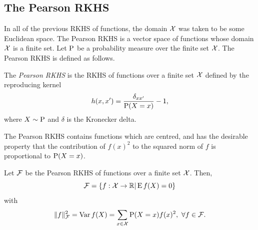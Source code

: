 \subsection{The Pearson RKHS}

In all of the previous RKHS of functions, the domain ${\mathcal X}$ was taken to be some Euclidean space. 
The Pearson RKHS is a vector space of functions whose domain ${\mathcal X}$ is a finite set.
Let $\operatorname{P}$ be a probability measure over the finite set ${\mathcal X}$. 
The Pearson RKHS is defined as follows.

\begin{definition}
  The \emph{Pearson RKHS} is the RKHS of functions over a finite set ${\mathcal X}$ defined by the reproducing kernel
  \[
    h(x,x') = \frac{\delta_{xx'}}{\operatorname{P}(X=x)} - 1,
  \]
  where $X \sim \operatorname{P}$ and $\delta$ is the Kronecker delta.
\end{definition}

The Pearson RKHS contains functions which are centred, and has the desirable property that the contribution of $f(x)^2$ to the squared norm of $f$ is proportional to $\operatorname{P}(X=x)$.

\begin{claim}
  Let ${\mathcal F}$ be the Pearson RKHS of functions over a finite set ${\mathcal X}$.
  Then,
  \[
    {\mathcal F} = \{f:{\mathcal X}\to\mathbb{R} | \operatorname{E} f(X) = 0 \}
  \]
  with
  \[
    \lVert f\rVert_{\mathcal F}^2 = \operatorname{Var} f(X) = \sum_{x\in{\mathcal X}} \operatorname{P}(X=x)f(x)^2, \ \forall f \in {\mathcal F}.
  \]
\end{claim}

